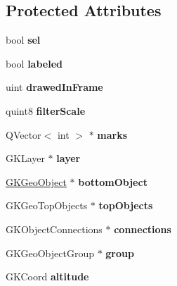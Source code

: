 \subsection*{Protected Attributes}
\begin{DoxyCompactItemize}
\item 
bool {\bfseries sel}\hypertarget{classGKGeoObject_a4f0895a6962f511ec1ff0ffa0a110839}{}\label{classGKGeoObject_a4f0895a6962f511ec1ff0ffa0a110839}

\item 
bool {\bfseries labeled}\hypertarget{classGKGeoObject_a5a268a805ce93fdbfc65fa21b31c2d66}{}\label{classGKGeoObject_a5a268a805ce93fdbfc65fa21b31c2d66}

\item 
uint {\bfseries drawed\+In\+Frame}\hypertarget{classGKGeoObject_a84c645246f15f9486fc05c69aae389ed}{}\label{classGKGeoObject_a84c645246f15f9486fc05c69aae389ed}

\item 
quint8 {\bfseries filter\+Scale}\hypertarget{classGKGeoObject_ab5e74f9b904c858ab6ef1dc6e8373366}{}\label{classGKGeoObject_ab5e74f9b904c858ab6ef1dc6e8373366}

\item 
Q\+Vector$<$ int $>$ $\ast$ {\bfseries marks}\hypertarget{classGKGeoObject_a4bc2d309d07e27df551e9294426c8e0e}{}\label{classGKGeoObject_a4bc2d309d07e27df551e9294426c8e0e}

\item 
G\+K\+Layer $\ast$ {\bfseries layer}\hypertarget{classGKGeoObject_adde7029125f1305d0f8f4af3740af4da}{}\label{classGKGeoObject_adde7029125f1305d0f8f4af3740af4da}

\item 
\hyperlink{classGKGeoObject}{G\+K\+Geo\+Object} $\ast$ {\bfseries bottom\+Object}\hypertarget{classGKGeoObject_a5c4cd6023e727c2d98ebe57aa9f43fbb}{}\label{classGKGeoObject_a5c4cd6023e727c2d98ebe57aa9f43fbb}

\item 
G\+K\+Geo\+Top\+Objects $\ast$ {\bfseries top\+Objects}\hypertarget{classGKGeoObject_a5529be519acf8afb068492993b12c641}{}\label{classGKGeoObject_a5529be519acf8afb068492993b12c641}

\item 
G\+K\+Object\+Connections $\ast$ {\bfseries connections}\hypertarget{classGKGeoObject_a090b81c96e2253a027bb0fd43c96bcc3}{}\label{classGKGeoObject_a090b81c96e2253a027bb0fd43c96bcc3}

\item 
G\+K\+Geo\+Object\+Group $\ast$ {\bfseries group}\hypertarget{classGKGeoObject_a4583b8095540e8e7d8f4a29515111edd}{}\label{classGKGeoObject_a4583b8095540e8e7d8f4a29515111edd}

\item 
G\+K\+Coord {\bfseries altitude}\hypertarget{classGKGeoObject_a80f3f44f516be302c2febc0168c88167}{}\label{classGKGeoObject_a80f3f44f516be302c2febc0168c88167}

\end{DoxyCompactItemize}
